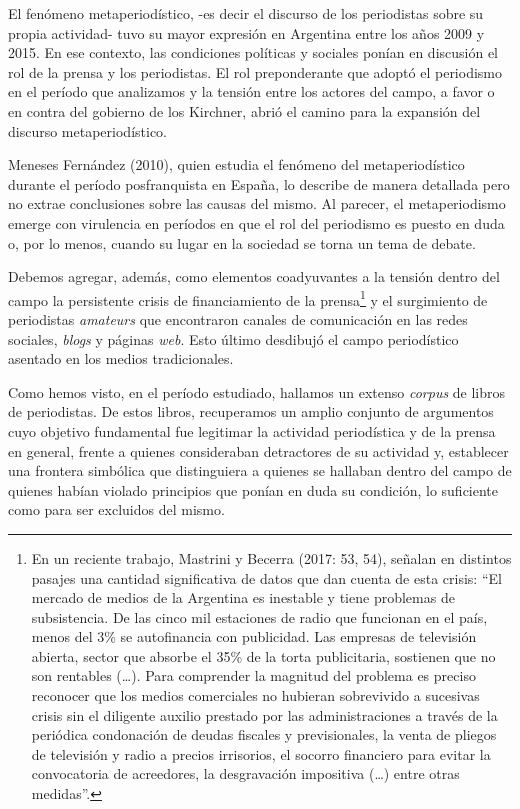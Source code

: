El fenómeno metaperiodístico, -es decir el discurso de los periodistas sobre su propia actividad- tuvo su mayor expresión en Argentina entre los años 2009 y 2015. En ese contexto, las condiciones políticas y sociales ponían en discusión el rol de la prensa y los periodistas. El rol preponderante que adoptó el periodismo en el período que analizamos y la tensión entre los actores del campo, a favor o en contra del gobierno de los Kirchner, abrió el camino para la expansión del discurso metaperiodístico.

Meneses Fernández (2010), quien estudia el fenómeno del metaperiodístico durante el período posfranquista en España, lo describe de manera detallada pero no extrae conclusiones sobre las causas del mismo. Al parecer, el metaperiodismo emerge con virulencia en períodos en que el rol del periodismo es puesto en duda o, por lo menos, cuando su lugar en la sociedad se torna un tema de debate.

Debemos agregar, además, como elementos coadyuvantes a la tensión dentro del campo la persistente crisis de financiamiento de la prensa\footnote{En un reciente trabajo, Mastrini y Becerra (2017: 53, 54), señalan en distintos pasajes una cantidad significativa de datos que dan cuenta de esta crisis: ``El mercado de medios de la Argentina es inestable y tiene problemas de subsistencia. De las cinco mil estaciones de radio que funcionan en el país, menos del 3\% se autofinancia con publicidad. Las empresas de televisión abierta, sector que absorbe el 35\% de la torta publicitaria, sostienen que no son rentables (\ldots). Para comprender la magnitud del problema es preciso reconocer que los medios comerciales no hubieran sobrevivido a sucesivas crisis sin el diligente auxilio prestado por las administraciones a través de la periódica condonación de deudas fiscales y previsionales, la venta de pliegos de televisión y radio a precios irrisorios, el socorro financiero para evitar la convocatoria de acreedores, la desgravación impositiva (\ldots) entre otras medidas''.} y el surgimiento de periodistas \emph{amateurs} que encontraron canales de comunicación en las redes sociales, \emph{blogs} y páginas \emph{web}. Esto último desdibujó el campo periodístico asentado en los medios tradicionales.

Como hemos visto, en el período estudiado, hallamos un extenso \emph{corpus} de libros de periodistas. De estos libros, recuperamos un amplio conjunto de argumentos cuyo objetivo fundamental fue legitimar la actividad periodística y de la prensa en general, frente a quienes consideraban detractores de su actividad y, establecer una frontera simbólica que distinguiera a quienes se hallaban dentro del campo de quienes habían violado principios que ponían en duda su condición, lo suficiente como para ser excluidos del mismo.

